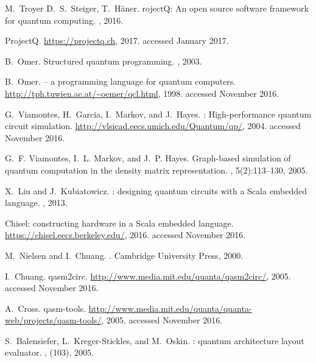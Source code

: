 \documentclass[USenglish,12pt,fleqn]{article} %
\begin{document}
\begin{thebibliography}{10}
M.~Troyer D.~S.~Steiger, T.~H\"aner.
roject{Q}: An open source software framework for quantum
  computing.
, 2016.

{P}roject{Q}.
\newblock \url{https://projectq.ch}, 2017.
\newblock accessed January 2017.

B.~Omer.
\newblock Structured quantum programming.
, 2003.

B.~Omer.
 -- a programming language for quantum computers.
\newblock \url{http://tph.tuwien.ac.at/~oemer/qcl.html}, 1998.
\newblock accessed November 2016.

G.~Viamontes, H.~Garcia, I.~Markov, and J.~Hayes.
: High-performance quantum circuit simulation.
\newblock \url{http://vlsicad.eecs.umich.edu/Quantum/qp/}, 2004.
\newblock accessed November 2016.

G.~F. Viamontes, I.~L. Markov, and J.~P. Hayes.
\newblock Graph-based simulation of quantum computation in the density matrix
  representation.
, 5(2):113--130, 2005.

X.~Liu and J.~Kubiatowicz.
: designing quantum circuits with a {S}cala embedded
  language.
,
  2013.

Chisel: constructing hardware in a {S}cala embedded language.
\newblock \url{https://chisel.eecs.berkeley.edu/}, 2016.
\newblock accessed November 2016.

M.~Nielsen and I.~Chuang.
.
\newblock Cambridge University Press, 2000.

I.~Chuang.
\newblock qasm2circ.
\newblock \url{http://www.media.mit.edu/quanta/qasm2circ/}, 2005.
\newblock accessed November 2016.

A.~Cross.
\newblock qasm-tools.
\newblock
  \url{http://www.media.mit.edu/quanta/quanta-web/projects/qasm-tools/}, 2005.
\newblock accessed November 2016.

S.~Balensiefer, L.~Kreger-Stickles, and M.~Oskin.
: quantum architecture layout evaluator.
,
  (103), 2005.


\end{thebibliography}
\end{document}
